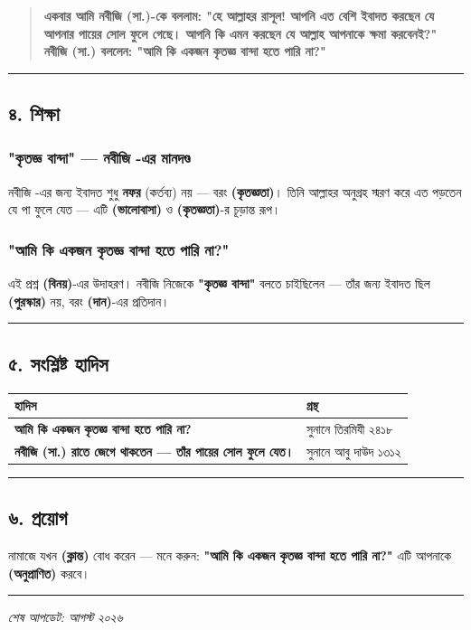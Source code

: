 \begin{quote}
\textbf{একবার আমি নবীজি (সা.)-কে বললাম: "হে আল্লাহর রাসূল! আপনি এত বেশি ইবাদত করছেন যে আপনার পায়ের সোল ফুলে গেছে। আপনি কি এমন করছেন যে আল্লাহ আপনাকে ক্ষমা করবেনই?"} \\
\textbf{নবীজি (সা.) বললেন: "আমি কি একজন কৃতজ্ঞ বান্দা হতে পারি না?"}
\end{quote}

\medskip\hrule\medskip

\subsection*{৪. শিক্ষা}

\subsubsection*{\textbf{"কৃতজ্ঞ বান্দা" — নবীজি -এর মানদণ্ড}}
নবীজি -এর জন্য ইবাদত শুধু \textbf{নফর} (কর্তব্য) নয় — বরং \textbf{ (কৃতজ্ঞতা)}। তিনি আল্লাহর অনুগ্রহ স্মরণ করে এত পড়তেন যে পা ফুলে যেত — এটি \textbf{ (ভালোবাসা)} ও \textbf{ (কৃতজ্ঞতা)}-র চূড়ান্ত রূপ।

\subsubsection*{\textbf{"আমি কি একজন কৃতজ্ঞ বান্দা হতে পারি না?"}}
এই প্রশ্ন \textbf{ (বিনয়)}-এর উদাহরণ। নবীজি  নিজেকে \textbf{"কৃতজ্ঞ বান্দা"} বলতে চাইছিলেন — তাঁর জন্য ইবাদত ছিল \textbf{ (পুরস্কার)} নয়, বরং \textbf{ (দান)}-এর প্রতিদান।

\medskip\hrule\medskip

\subsection*{৫. সংশ্লিষ্ট হাদিস}

\begin{table}[h]\centering\small
\begin{tabular}{ll}
হাদিস & গ্রন্থ \\
\hline
\textbf{\lat{“}আমি কি একজন কৃতজ্ঞ বান্দা হতে পারি না?\lat{”}} & সুনানে তিরমিযী ২৪১৮ \\
\textbf{\lat{“}নবীজি (সা.) রাতে জেগে থাকতেন — তাঁর পায়ের সোল ফুলে যেত।\lat{”}} & সুনানে আবু দাউদ ১৩১২ \\
\hline
\end{tabular}
\end{table}

\medskip\hrule\medskip

\subsection*{৬. প্রয়োগ}

নামাজে যখন \textbf{ (ক্লান্ত)} বোধ করেন — মনে করুন: \textbf{"আমি কি একজন কৃতজ্ঞ বান্দা হতে পারি না?"} এটি আপনাকে \textbf{ (অনুপ্রাণিত)} করবে।

\medskip\hrule\medskip

\textit{শেষ আপডেট: আগস্ট ২০২৬}


